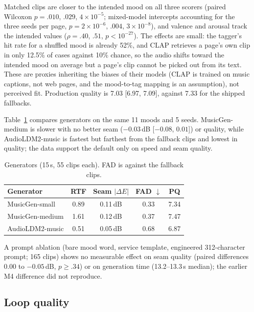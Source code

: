 \documentclass[conference]{IEEEtran}
\begin{document}
Matched clips are closer to the intended mood on all three scorers (paired
Wilcoxon $p = .010$, $.029$, $4\times10^{-5}$; mixed-model intercepts accounting
for the three seeds per page, $p = 2\times10^{-6}$, $.004$, $3\times10^{-8}$), and
valence and arousal track the intended values ($\rho = .40$, $.51$, $p <
10^{-27}$). The effects are small: the tagger's hit
rate for a shuffled mood is already 52\%, and CLAP retrieves a page's own clip in
only 12.5\% of cases against 10\% chance, so the audio shifts toward the intended
mood on average but a page's clip cannot be picked out from its text. These are
proxies inheriting the biases of their models (CLAP is trained on music captions,
not web pages, and the mood-to-tag mapping is an assumption), not perceived fit.
Production quality is 7.03 [6.97, 7.09], against 7.33 for the shipped fallbacks.

Table~\ref{tab:generators} compares generators on the same 11 moods and 5 seeds.
MusicGen-medium is slower with no better seam ($-0.03$\,dB [$-0.08$, $0.01$]) or
quality, while AudioLDM2-music is fastest but farthest from the fallback clips
and lowest in quality; the data support the default only on speed and seam
quality.

\begin{table}[t]
\caption{Generators (15\,s, 55 clips each). FAD is against the fallback clips.}
\label{tab:generators}
\begin{center}
\scriptsize
\setlength{\tabcolsep}{3pt}
\begin{tabular}{lcccc}
\toprule
\textbf{Generator} & \textbf{RTF} & \textbf{Seam $|\Delta E|$} & \textbf{FAD} $\downarrow$ & \textbf{PQ} \\
\midrule
MusicGen-small  & 0.89 & 0.11\,dB & 0.33 & 7.34 \\
MusicGen-medium & 1.61 & 0.12\,dB & 0.37 & 7.47 \\
AudioLDM2-music & 0.51 & 0.05\,dB & 0.68 & 6.87 \\
\bottomrule
\end{tabular}
\end{center}
\end{table}

A prompt
ablation (bare mood word, service template, engineered 312-character prompt; 165
clips) shows no measurable effect on seam quality (paired differences 0.00 to
$-0.05$\,dB, $p \geq .34$) or on generation time (13.2--13.3\,s median); the
earlier M4 difference did not reproduce.

\subsection{Loop quality}
\label{sec:res-loop}
\end{document}

